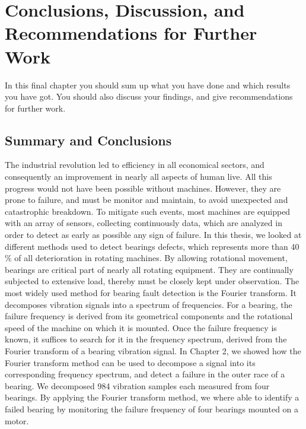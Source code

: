\documentclass[thesis.tex]{subfiles}
\begin{document}
	\chapter[Conclusions]{Conclusions, Discussion, and Recommendations for Further Work}
	\label{ch:conclusions}
	In this final chapter you should sum up what you have done and which results you have got. 
	You should also discuss your findings, and give recommendations for further work.
	
	\section{Summary and Conclusions}
	\label{sec:summary_and_conclusions}
	The industrial revolution led to efficiency in all economical sectors, and consequently an improvement in nearly all aspects of human live. All this progress would not have been possible without machines. However, they are prone to failure, and must be monitor and maintain, to avoid unexpected and catastrophic breakdown. To mitigate such events, most machines are equipped with an array of sensors, collecting continuously data, which are analyzed in order to detect as early as possible any sign of failure.
	\justify
	In this thesis, we looked at different methods used to detect bearings defects, which represents more than 40 $\%$ of all deterioration in rotating machines. By allowing rotational movement, bearings are critical part of nearly all rotating equipment. They are continually subjected to extensive load, thereby must be closely kept under observation. The most widely used method for bearing fault detection is the Fourier transform. It decomposes vibration signals into a spectrum of frequencies. For a bearing, the failure frequency is derived from its geometrical components and the rotational speed of the machine on which it is mounted. Once the failure frequency is known, it suffices to search for it in the frequency spectrum, derived from the Fourier transform of a bearing vibration signal.
	\clearpage
	\justify
	In Chapter 2, we showed how the Fourier transform method can be used to decompose a signal into its corresponding frequency spectrum, and detect a failure in the outer race of a bearing. We decomposed 984 vibration samples each measured from four bearings. By applying the Fourier transform method, we where able to identify a failed bearing by monitoring the failure frequency of four bearings mounted on a motor.
	
\end{document}

